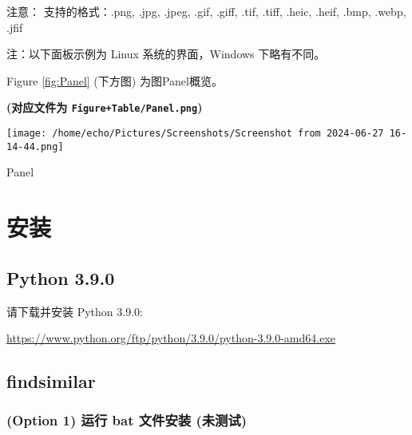 \documentclass[
]{article}
\begin{document}
注意：
支持的格式：.png, .jpg, .jpeg, .gif, .giff, .tif, .tiff, .heic, .heif, .bmp, .webp, .jfif

注：以下面板示例为 Linux 系统的界面，Windows 下略有不同。

\begin{center}\vspace{1.5cm}\end{center}

Figure \ref{fig:Panel} (下方图) 为图Panel概览。

\textbf{(对应文件为 \texttt{Figure+Table/Panel.png})}

\def\@captype{figure}
\begin{center}
\texttt{[image: /home/echo/Pictures/Screenshots/Screenshot from 2024-06-27 16-14-44.png]}
\caption{Panel}\label{fig:Panel}
\end{center}

\begin{center}\vspace{1.5cm}\end{center}

\hypertarget{ux5b89ux88c5}{%
\section{安装}\label{ux5b89ux88c5}}

\hypertarget{python-3.9.0}{%
\subsection{Python 3.9.0}\label{python-3.9.0}}

请下载并安装 Python 3.9.0:

\url{https://www.python.org/ftp/python/3.9.0/python-3.9.0-amd64.exe}

\hypertarget{findsimilar}{%
\subsection{findsimilar}\label{findsimilar}}

\hypertarget{option-1-ux8fd0ux884c-bat-ux6587ux4ef6ux5b89ux88c5-ux672aux6d4bux8bd5}{%
\subsubsection{(Option 1) 运行 bat 文件安装 (未测试)}\label{option-1-ux8fd0ux884c-bat-ux6587ux4ef6ux5b89ux88c5-ux672aux6d4bux8bd5}}
\end{document}
